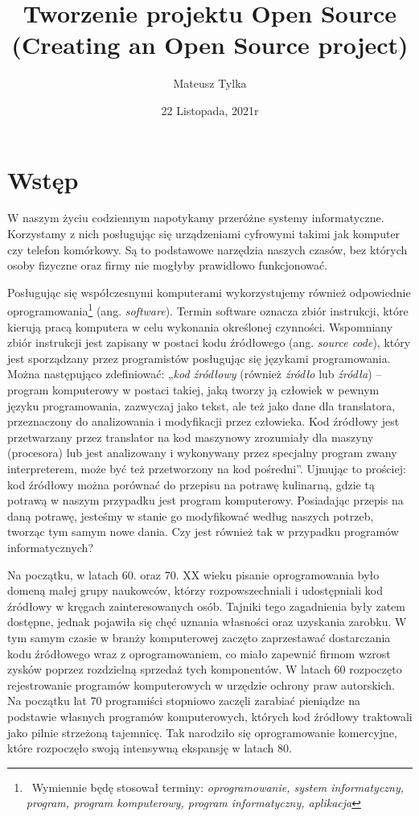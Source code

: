 \documentclass{article}
\title{Tworzenie projektu Open Source (Creating an Open Source project)}
\author{Mateusz Tylka}
\date{22 Listopada, 2021r}
\begin{document}
\maketitle
\newpage
\newpage
\tableofcontents
\newpage

\section{Wstęp}

\hspace{4mm} W naszym życiu codziennym napotykamy przeróżne systemy informatyczne. Korzystamy z nich posługując się urządzeniami cyfrowymi takimi jak komputer czy telefon komórkowy. Są to podstawowe narzędzia naszych czasów, bez których osoby fizyczne oraz firmy nie mogłyby prawidłowo funkcjonować.

Posługując się współczesnymi komputerami wykorzystujemy również odpowiednie oprogramowania\footnote{\, Wymiennie będę stosował terminy: \emph{oprogramowanie, system informatyczny, program, program komputerowy, program informatyczny, aplikacja}} (ang. \emph{software}). Termin software oznacza zbiór instrukcji, które kierują pracą komputera w celu wykonania określonej czynności\cite{Kotula}. Wspomniany zbiór instrukcji jest zapisany w postaci kodu źródłowego (ang. \emph{source code}), który jest sporządzany przez programistów posługując się językami programowania. Można następująco zdefiniować: „\emph{kod źródłowy} (również \emph{źródło} lub \emph{źródła}) – program komputerowy w postaci takiej, jaką tworzy ją człowiek w pewnym języku programowania, zazwyczaj jako tekst, ale też jako dane dla translatora, przeznaczony do analizowania i modyfikacji przez człowieka. Kod źródłowy jest przetwarzany przez translator na kod maszynowy zrozumiały dla maszyny (procesora) lub jest analizowany i  wykonywany przez specjalny program zwany interpreterem, może być też przetworzony na kod pośredni”\cite{Kotula}. Ujmując to prościej: kod źródłowy można porównać do przepisu na potrawę kulinarną, gdzie tą potrawą w naszym przypadku jest program komputerowy. Posiadając przepis na daną potrawę, jesteśmy w stanie go modyfikować według naszych potrzeb, tworząc tym samym nowe dania. Czy jest również tak w przypadku programów informatycznych? 

Na początku, w latach 60. oraz 70. XX wieku pisanie oprogramowania było domeną małej grupy naukowców, którzy rozpowszechniali i udostępniali kod źródłowy w kręgach zainteresowanych osób. Tajniki tego zagadnienia były zatem dostępne, jednak pojawiła się chęć uznania własności oraz uzyskania zarobku. W tym samym czasie w branży komputerowej zaczęto zaprzestawać dostarczania kodu źródłowego wraz z oprogramowaniem, co miało zapewnić firmom wzrost zysków poprzez rozdzielną sprzedaż tych komponentów. W latach 60 rozpoczęto rejestrowanie programów komputerowych w urzędzie ochrony praw autorskich\cite{Kotula}. Na początku lat 70 programiści stopniowo zaczęli zarabiać pieniądze na podstawie własnych programów komputerowych, których kod źródłowy traktowali jako pilnie strzeżoną tajemnicę\cite{Richter}. Tak narodziło się oprogramowanie komercyjne, które rozpoczęło swoją intensywną ekspansję w latach 80\cite{Kotula}. \newpage
\end{document}
